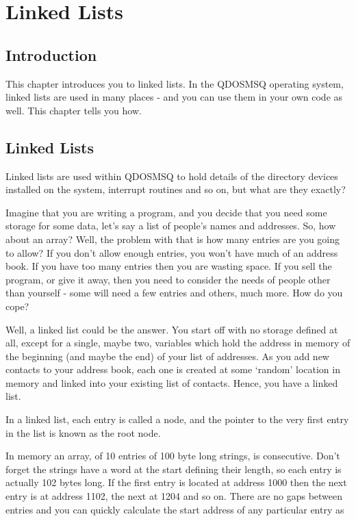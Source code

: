 \chapter{Linked Lists}

\section{Introduction}
\label{ch10-intro}%

This chapter introduces you to linked lists. In the QDOSMSQ
    operating system, linked lists are used in many places -{} and you can use
    them in your own code as well. This chapter tells you how.

\section{Linked Lists}
\label{ch10-linked-lists}%

Linked lists are used within QDOSMSQ to hold details of the
    directory devices installed on the system, interrupt routines and so on,
    but what are they exactly?

Imagine that you are writing a program, and you decide that you need
    some storage for some data, let's say a list of people's names and
    addresses. So, how about an array? Well, the problem with that is how many
    entries are you going to allow? If you don't allow enough entries, you
    won't have much of an address book. If you have too many entries then you
    are wasting space. If you sell the program, or give it away, then you need
    to consider the needs of people other than yourself -{} some will need a few
    entries and others, much more. How do you cope?

Well, a linked list could be the answer. You start off with no
    storage defined at all, except for a single, maybe two, variables which
    hold the address in memory of the beginning (and maybe the end) of your
    list of addresses. As you add new contacts to your address book, each one
    is created at some `random' location in memory and linked into your
    existing list of contacts. Hence, you have a linked list.

In a linked list, each entry is called a node, and the pointer to
    the very first entry in the list is known as the root node.

In memory an array, of 10 entries of 100 byte long strings, is
    consecutive. Don't forget the strings have a word at the start defining
    their length, so each entry is actually 102 bytes long. If the first entry
    is located at address 1000 then the next entry is at address 1102, the
    next at 1204 and so on. There are no gaps between entries and you can
    quickly calculate the start address of any particular entry as 
    
